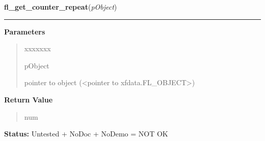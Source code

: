 \hspace{.8\funcindent}\begin{boxedminipage}{\funcwidth}

    \raggedright \textbf{fl\_get\_counter\_repeat}(\textit{pObject})

    \vspace{-1.5ex}

    \rule{\textwidth}{0.5\fboxrule}
\setlength{\parskip}{2ex}
\setlength{\parskip}{1ex}
      \textbf{Parameters}
      \vspace{-1ex}

      \begin{quote}
        \begin{Ventry}{xxxxxxx}

          \item[pObject]

          pointer to object ({\textless}pointer to 
          xfdata.FL\_OBJECT{\textgreater})

        \end{Ventry}

      \end{quote}

      \textbf{Return Value}
    \vspace{-1ex}

      \begin{quote}
      num

      \end{quote}

\textbf{Status:} Untested + NoDoc + NoDemo = NOT OK



    \end{boxedminipage}

    \label{xformslib:library:fl_set_counter_repeat}

    \vspace{0.5ex}


